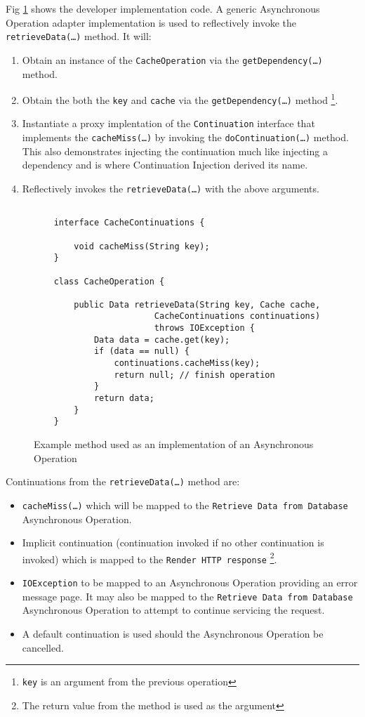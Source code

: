 \documentclass{article}
\begin{document}
Fig \ref{fig:Example_Method_Operation} shows the developer implementation code. 
A generic Asynchronous Operation adapter implementation is used to reflectively invoke
the \texttt{retrieveData(\ldots)} method. It will:
\begin{enumerate}
  \item Obtain an instance of the \texttt{CacheOperation} via the \texttt{getDependency(\ldots)} method.
  \item Obtain the both the \texttt{key} and \texttt{cache} via the \texttt{getDependency(\ldots)} method \footnote{\texttt{key} is an argument from the previous operation}.
  \item Instantiate a proxy implentation of the \texttt{Continuation} interface that implements the \texttt{cacheMiss(\ldots)} by invoking the \texttt{doContinuation(\ldots)} method.  This also demonstrates injecting the continuation much like injecting a dependency and is where Continuation Injection derived its name. 
  \item Reflectively invokes the \texttt{retrieveData(\ldots)} with the above arguments.
\end{enumerate}

\begin{figure}[!t]
\begin{verbatim}

    interface CacheContinuations {

        void cacheMiss(String key);
    }

    class CacheOperation {
    
        public Data retrieveData(String key, Cache cache, 
                        CacheContinuations continuations)
                        throws IOException {
        	Data data = cache.get(key);
        	if (data == null) {
        	    continuations.cacheMiss(key);
        	    return null; // finish operation
        	}
        	return data;
        }
    }
\end{verbatim}
\caption[Caption for Code]{Example method used as an implementation of an Asynchronous Operation}
\label{fig:Example_Method_Operation}
\end{figure}

Continuations from the \texttt{retrieveData(\ldots)} method are:
\begin{itemize}
  \item \texttt{cacheMiss(\ldots)} which will be mapped to the \texttt{Retrieve Data from Database} Asynchronous Operation.
  \item Implicit continuation (continuation invoked if no other continuation is invoked) which is mapped to the \texttt{Render HTTP response} \footnote{The return value from the method is used as the argument}.
  \item \texttt{IOException} to be mapped to an Asynchronous Operation providing an error message page.  It may also be mapped to the \texttt{Retrieve Data from Database} Asynchronous Operation to attempt to continue servicing the request.
  \item A default continuation is used should the Asynchronous Operation be cancelled.
\end{itemize}
\end{document}
